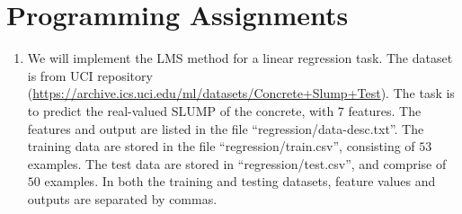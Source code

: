 \documentclass[12pt, fullpage,letterpaper]{article}
\begin{document}
\section{Programming Assignments}

\begin{enumerate}
\item We will implement the LMS method for a linear regression task. The dataset is from UCI repository (\url{https://archive.ics.uci.edu/ml/datasets/Concrete+Slump+Test}). The task is to predict the real-valued SLUMP of the concrete, with $7$ features. The features and output are listed in the file ``regression/data-desc.txt''. The training data are stored in the file ``regression/train.csv'', consisting of $53$ examples. The test data are stored in ``regression/test.csv'', and comprise of $50$ examples. In both the training and testing datasets, feature values and outputs are separated by commas. 


\end{enumerate}
\end{document}

